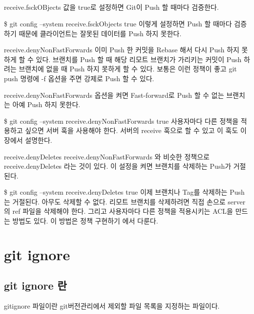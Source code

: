 \documentclass[12pt, a4paper, oneside]{book}
\let\stdsection\section
\renewcommand\section{\newpage\stdsection}
\begin{document}
\paragraph{}
receive.fsckOBjects 값을 true로 설정하면 Git이 Push 할 때마다 검증한다.

\$ git config --system receive.fsckObjects true
이렇게 설정하면 Push 할 때마다 검증하기 때문에 클라이언트는 잘못된 데이터를 Push 하지 못한다.

receive.denyNonFastForwards
이미 Push 한 커밋을 Rebase 해서 다시 Push 하지 못하게 할 수 있다. 브랜치를 Push 할 때 해당 리모트 브랜치가 가리키는 커밋이 Push 하려는 브랜치에 없을 때 Push 하지 못하게 할 수 있다. 보통은 이런 정책이 좋고 git push 명령에 -f 옵션을 주면 강제로 Push 할 수 있다.

receive.denyNonFastForwards 옵션을 켜면 Fast-forward로 Push 할 수 없는 브랜치는 아예 Push 하지 못한다.

\$ git config --system receive.denyNonFastForwards true
사용자마다 다른 정책을 적용하고 싶으면 서버 훅을 사용해야 한다. 서버의 receive 훅으로 할 수 있고 이 훅도 이 장에서 설명한다.

receive.denyDeletes
receive.denyNonFastForwards 와 비슷한 정책으로 receive.denyDeletes 라는 것이 있다. 이 설정을 켜면 브랜치를 삭제하는 Push가 거절된다.

\$ git config --system receive.denyDeletes true
이제 브랜치나 Tag를 삭제하는 Push는 거절된다. 아무도 삭제할 수 없다. 리모트 브랜치를 삭제하려면 직접 손으로 server의 ref 파일을 삭제해야 한다. 그리고 사용자마다 다른 정책을 적용시키는 ACL을 만드는 방법도 있다. 이 방법은 정책 구현하기 에서 다룬다.



	\chapter 	{git ignore}

	\noptcrule
	\minitoc
				

%										
	\section{git ignore 란}


		gitignore 파일이란 git버전관리에서 제외할 파일 목록을 지정하는 파일이다.
\end{document}
